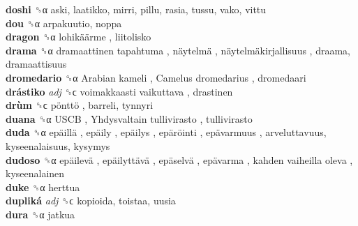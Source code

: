 \textbf{doshi} ␝α  aski, laatikko, mirri, pillu, rasia, tussu, vako, vittu  \\
\textbf{dou} ␝α  arpakuutio, noppa  \\
\textbf{dragon} ␝α   lohikäärme , liitolisko  \\
\textbf{drama} ␝α   dramaattinen tapahtuma ,  näytelmä ,  näytelmäkirjallisuus , draama, dramaattisuus  \\
\textbf{dromedario} ␝α   Arabian kameli ,  Camelus dromedarius , dromedaari  \\
\textbf{drástiko} \emph{adj}  ␝ϲ   voimakkaasti vaikuttava , drastinen  \\
\textbf{drùm} ␝ϲ   pönttö , barreli, tynnyri  \\
\textbf{duana} ␝α   USCB ,  Yhdysvaltain tullivirasto , tullivirasto  \\
\textbf{duda} ␝α   epäillä ,  epäily ,  epäilys ,  epäröinti ,  epävarmuus , arveluttavuus, kyseenalaisuus, kysymys  \\
\textbf{dudoso} ␝α   epäilevä ,  epäilyttävä ,  epäselvä ,  epävarma ,  kahden vaiheilla oleva , kyseenalainen  \\
\textbf{duke} ␝α  herttua  \\
\textbf{dupliká} \emph{adj}  ␝ϲ  kopioida, toistaa, uusia  \\
\textbf{dura} ␝α  jatkua  \\

